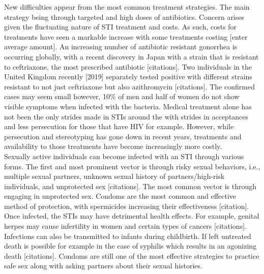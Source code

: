 \documentclass[
  english,
  donotrepeattitle,doc, 12pt, a4paper,floatsintext]{apa7}
\begin{document}
New difficulties appear from the most common treatment strategies. The main strategy being through targeted and high doses of antibiotics. Concern arises given the fluctuating nature of STI treatment and costs. As such, costs for treatments have seen a markable increase with some treatments costing {[}enter average amount{]}. An increasing number of antibiotic resistant gonorrhea is occurring globally, with a recent discovery in Japan with a strain that is resistant to ceftriaxone, the most prescribed antibiotic {[}citations{]}. Two individuals in the United Kingdom recently {[}2019{]} separately tested positive with different strains resistant to not just ceftriaxone but also azithromycin {[}citations{]}. The confirmed cases may seem small however, 10\% of men and half of women do not show visible symptoms when infected with the bacteria. Medical treatment alone has not been the only strides made in STIs around the with strides in acceptances and less persecution for those that have HIV for example. However, while persecution and stereotyping has gone down in recent years, treatments and availability to those treatments have become increasingly more costly.\\
Sexually active individuals can become infected with an STI through various forms. The first and most prominent vector is through risky sexual behaviors, i.e., multiple sexual partners, unknown sexual history of partners/high-risk individuals, and unprotected sex {[}citations{]}. The most common vector is through engaging in unprotected sex. Condoms are the most common and effective method of protection, with spermicides increasing their effectiveness {[}citation{]}. Once infected, the STIs may have detrimental health effects. For example, genital herpes may cause infertility in women and certain types of cancers {[}citations{]}. Infections can also be transmitted to infants during childbirth. If left untreated death is possible for example in the case of syphilis which results in an agonizing death {[}citations{]}. Condoms are still one of the most effective strategies to practice safe sex along with asking partners about their sexual histories.
\end{document}

